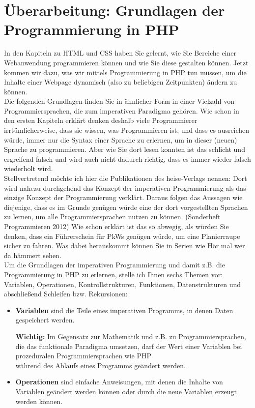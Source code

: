 \section{Überarbeitung: Grundlagen der Programmierung in PHP}

In den Kapiteln zu HTML und CSS haben Sie gelernt, wie Sie Bereiche einer Webanwendung programmieren können und wie Sie diese gestalten können. Jetzt kommen wir dazu, was wir mittels Programmierung in PHP tun müssen, um die Inhalte einer Webpage dynamisch (also zu beliebigen Zeitpunkten) ändern zu können.\\

Die folgenden Grundlagen finden Sie in ähnlicher Form in einer Vielzahl von Programmiersprachen, die zum imperativen Paradigma gehören. Wie schon in den ersten Kapiteln erklärt denken deshalb viele Programmierer irrtümlicherweise, dass sie wissen, was Programmieren ist, und dass es ausreichen würde, immer nur die Syntax einer Sprache zu erlernen, um in dieser (neuen) Sprache zu programmieren. Aber wie Sie dort lesen konnten ist das schlicht und ergreifend falsch und wird auch nicht dadurch richtig, dass es immer wieder falsch wiederholt wird.\\

Stellvertretend möchte ich hier die Publikationen des heise-Verlags nennen: Dort wird nahezu durchgehend das Konzept der imperativen Programmierung als das einzige Konzept der Programmierung verklärt. Daraus folgen das Aussagen wie diejenige, dass es im Grunde genügen würde eine der dort vorgestellten Sprachen zu lernen, um alle Programmiersprachen nutzen zu können. (Sonderheft \glqq{}Programmieren\grqq{} 2012) Wie schon erklärt ist das so abwegig, als würden Sie denken, dass ein Führerschein für PkWs genügen würde, um eine Planierraupe sicher zu fahren. Was dabei herauskommt können Sie in Serien wie \glqq{}Hör mal wer da hämmert\grqq{} sehen.\\

Um die Grundlagen der imperativen Programmierung und damit z.B. die Programmierung in PHP zu erlernen, stelle ich Ihnen sechs Themen vor: Variablen, Operationen, Kontrollstrukturen, Funktionen, Datenstrukturen und abschließend Schleifen bzw. Rekursionen:

\begin{itemize}
	\item \textbf{Variablen} sind die Teile eines imperativen Programms, in denen Daten gespeichert werden.
	
	\textbf{Wichtig:} Im Gegensatz zur Mathematik und z.B. zu Programmiersprachen, die das funktionale Paradigma umsetzen, darf der Wert einer Variablen bei prozeduralen Programmiersprachen wie PHP \\während des Ablaufs eines Programms geändert werden.
	
	\item \textbf{Operationen} sind einfache Anweisungen, mit denen die Inhalte von Variablen geändert werden können oder durch die neue Variablen erzeugt werden können. 
\end{itemize}
	
